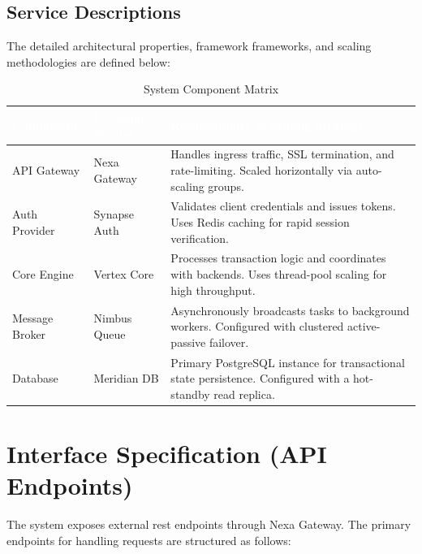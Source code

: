 \documentclass[11pt,a4paper]{article}
\begin{document}
\begin{center}
\end{center}

\newpage

\subsection{Service Descriptions}
The detailed architectural properties, framework frameworks, and scaling methodologies are defined below:

\begin{table}[h]
\centering
\sffamily\small
\begin{tabularx}{\linewidth}{|l|p{3.5cm}|X|}
\hline
\rowcolor{primary}
\textcolor{white}{\textbf{Component}} & \textcolor{white}{\textbf{Fictional Service}} & \textcolor{white}{\textbf{Responsibility \& Scaling Strategy}} \\
\hline
API Gateway & Nexa Gateway & Handles ingress traffic, SSL termination, and rate-limiting. Scaled horizontally via auto-scaling groups. \\
\hline
\rowcolor{lightbg}
Auth Provider & Synapse Auth & Validates client credentials and issues tokens. Uses Redis caching for rapid session verification. \\
\hline
Core Engine & Vertex Core & Processes transaction logic and coordinates with backends. Uses thread-pool scaling for high throughput. \\
\hline
\rowcolor{lightbg}
Message Broker & Nimbus Queue & Asynchronously broadcasts tasks to background workers. Configured with clustered active-passive failover. \\
\hline
Database & Meridian DB & Primary PostgreSQL instance for transactional state persistence. Configured with a hot-standby read replica. \\
\hline
\end{tabularx}
\caption{System Component Matrix}
\end{table}

\section{Interface Specification (API Endpoints)}
The system exposes external rest endpoints through Nexa Gateway. The primary endpoints for handling requests are structured as follows:
\end{document}

